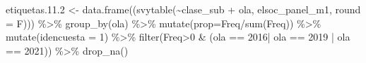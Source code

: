 \documentclass[
  12pt,
]{book}
\newenvironment{Shaded}{\begin{snugshade}}{\end{snugshade}}
\newcommand{\AttributeTok}[1]{\textcolor[rgb]{0.77,0.63,0.00}{#1}}
\newcommand{\DecValTok}[1]{\textcolor[rgb]{0.00,0.00,0.81}{#1}}
\newcommand{\FloatTok}[1]{\textcolor[rgb]{0.00,0.00,0.81}{#1}}
\newcommand{\FunctionTok}[1]{\textcolor[rgb]{0.00,0.00,0.00}{#1}}
\newcommand{\NormalTok}[1]{#1}
\newcommand{\OtherTok}[1]{\textcolor[rgb]{0.56,0.35,0.01}{#1}}
\newcommand{\SpecialCharTok}[1]{\textcolor[rgb]{0.00,0.00,0.00}{#1}}
\newcommand{\StringTok}[1]{\textcolor[rgb]{0.31,0.60,0.02}{#1}}
\begin{document}
\begin{Shaded}
\begin{Highlighting}[]
\NormalTok{etiquetas.}\FloatTok{11.2} \OtherTok{\textless{}{-}} \FunctionTok{data.frame}\NormalTok{((}\FunctionTok{svytable}\NormalTok{(}\SpecialCharTok{\textasciitilde{}}\NormalTok{clase\_sub }\SpecialCharTok{+}\NormalTok{ ola, elsoc\_panel\_m1, }\AttributeTok{round =}\NormalTok{ F))) }\SpecialCharTok{\%\textgreater{}\%} 
  \FunctionTok{group\_by}\NormalTok{(ola) }\SpecialCharTok{\%\textgreater{}\%} \FunctionTok{mutate}\NormalTok{(}\AttributeTok{prop=}\NormalTok{Freq}\SpecialCharTok{/}\FunctionTok{sum}\NormalTok{(Freq)) }\SpecialCharTok{\%\textgreater{}\%} \FunctionTok{mutate}\NormalTok{(}\AttributeTok{idencuesta =} \DecValTok{1}\NormalTok{) }\SpecialCharTok{\%\textgreater{}\%} 
  \FunctionTok{filter}\NormalTok{(Freq}\SpecialCharTok{\textgreater{}}\DecValTok{0} \SpecialCharTok{\&}\NormalTok{ (ola }\SpecialCharTok{==} \StringTok{\textquotesingle{}2016\textquotesingle{}}\SpecialCharTok{|}\NormalTok{ ola }\SpecialCharTok{==} \StringTok{\textquotesingle{}2019\textquotesingle{}} \SpecialCharTok{|}\NormalTok{ ola }\SpecialCharTok{==} \StringTok{\textquotesingle{}2021\textquotesingle{}}\NormalTok{)) }\SpecialCharTok{\%\textgreater{}\%} 
  \FunctionTok{drop\_na}\NormalTok{()}


\end{Highlighting}
\end{Shaded}
\end{document}
